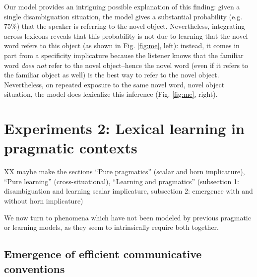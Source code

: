 \documentclass{article} %
\begin{document}
Our model provides an intriguing possible explanation of this finding: given a single disambiguation situation, the model gives a substantial probability (e.g. 75\%) that the speaker is referring to the novel object. Nevertheless, integrating across lexicons reveals that this probability is not due to learning that the novel word refers to this object (as shown in Fig. \ref{fig:me}, left): instead, it comes in part from a specificity implicature because the listener knows that the familiar word \emph{does not} refer to the novel object--hence the novel word (even if it refers to the familiar object as well) is the best way to refer to the novel object. Nevertheless, on repeated exposure to the same novel word, novel object situation, the model does lexicalize this inference (Fig. \ref{fig:me}, right). 


\section{Experiments 2: Lexical learning in pragmatic contexts}

XX maybe make the sections ``Pure pragmatics'' (scalar and horn implicature), ``Pure learning'' (cross-situational), ``Learning and pragmatics'' (subsection 1: disambiguation and learning scalar implicature, subsection 2: emergence with and without horn implicature)

We now turn to phenomena which have not been modeled by previous pragmatic or learning models, as they seem to intrinsically require both together.

\subsection{Emergence of efficient communicative conventions}
\end{document}
